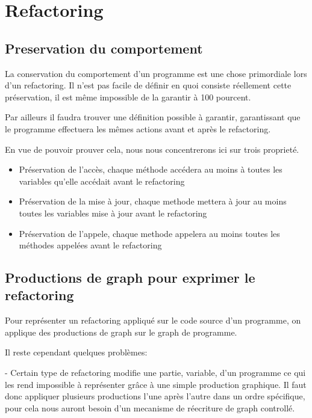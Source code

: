 \documentclass[a4paper, 12pt]{article}
\begin{document}
\newpage
\section{Refactoring}

\subsection{Preservation du comportement}
\label{subsec:preservationDuComportement}

La conservation du comportement d'un programme est une chose primordiale lors d'un refactoring. Il n'est pas facile de définir en quoi consiste réellement cette préservation, il est même impossible de la garantir à 100 pourcent. 

Par ailleurs il faudra trouver une définition possible à garantir, garantissant que le programme effectuera les mêmes actions avant et après le refactoring. 

En vue de pouvoir prouver cela, nous nous concentrerons ici sur trois proprieté.

\begin{itemize}
\item Préservation de l'accès, chaque méthode accédera au moins à toutes les variables qu'elle accédait avant le refactoring
\item Préservation de la mise à jour, chaque methode mettera à jour au moins toutes les variables mise à jour avant le refactoring
\item Préservation de l'appele, chaque methode appelera au moins toutes les méthodes appelées avant le refactoring
\end{itemize}

\subsection{Productions de graph pour exprimer le refactoring}

Pour représenter un refactoring appliqué sur le code source d'un programme, on applique des productions de graph sur le graph de programme.

Il reste cependant quelques problèmes:

- Certain type de refactoring modifie une partie, variable, d'un programme ce qui les rend impossible à représenter grâce à une simple production graphique. Il faut donc appliquer plusieurs productions l'une après l'autre dans un ordre spécifique, pour cela nous auront besoin d'un mecanisme de réecriture de graph controllé.
\end{document}
